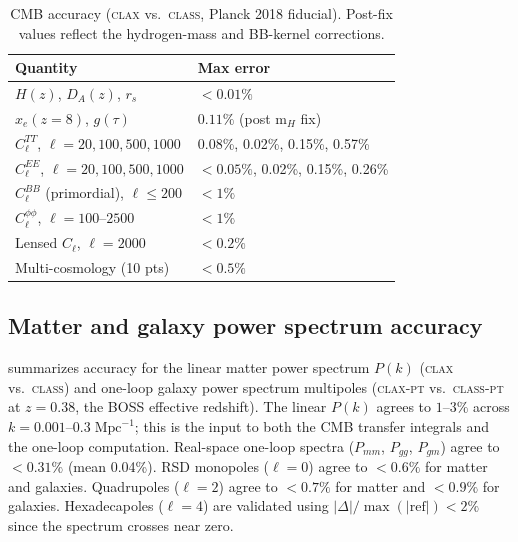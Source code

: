 \documentclass{article}
\newcommand{\clax}{\textsc{clax}\xspace}
\newcommand{\claxpt}{\textsc{clax-pt}\xspace}
\newcommand{\class}{\textsc{class}\xspace}
\newcommand{\classpt}{\textsc{class-pt}\xspace}
\newcommand{\Cl}{C_\ell}
\newcommand{\Pk}{P(k)}
\begin{document}
\begin{table}[t]
\caption{CMB accuracy (\clax vs.\ \class, Planck 2018 fiducial). Post-fix values reflect the hydrogen-mass and BB-kernel corrections.}
\label{tab:cmb_accuracy}
\centering
\footnotesize
\setlength{\tabcolsep}{3pt}
\begin{tabular}{@{}ll@{}}
\toprule
Quantity & Max error \\
\midrule
$H(z)$, $D_A(z)$, $r_s$ & $< 0.01\%$ \\
$x_e(z\!=\!8)$, $g(\tau)$ & $0.11\%$ (post m$_H$ fix) \\
$\Cl^{TT}$, $\ell = 20, 100, 500, 1000$ & 0.08\%, 0.02\%, 0.15\%, 0.57\% \\
$\Cl^{EE}$, $\ell = 20, 100, 500, 1000$ & $< 0.05\%$, 0.02\%, 0.15\%, 0.26\% \\
$\Cl^{BB}$ (primordial), $\ell \leq 200$ & $< 1\%$ \\
$\Cl^{\phi\phi}$, $\ell = 100$--$2500$ & $< 1\%$ \\
Lensed $\Cl$, $\ell = 2000$ & $< 0.2\%$ \\
Multi-cosmology (10 pts) & $< 0.5\%$ \\
\bottomrule
\end{tabular}
\end{table}

\subsection{Matter and galaxy power spectrum accuracy}

 summarizes accuracy for the linear matter power spectrum $\Pk$ (\clax vs.\ \class) and one-loop galaxy power spectrum multipoles (\claxpt vs.\ \classpt at $z = 0.38$, the BOSS effective redshift).
The linear $\Pk$ agrees to $1$--$3\%$ across $k = 0.001$--$0.3\;\mathrm{Mpc}^{-1}$; this is the input to both the CMB transfer integrals and the one-loop computation.
Real-space one-loop spectra ($P_{mm}$, $P_{gg}$, $P_{gm}$) agree to $< 0.31\%$ (mean 0.04\%).
RSD monopoles ($\ell = 0$) agree to $< 0.6\%$ for matter and galaxies.
Quadrupoles ($\ell = 2$) agree to $< 0.7\%$ for matter and $< 0.9\%$ for galaxies.
Hexadecapoles ($\ell = 4$) are validated using $|\Delta|/\max(|\mathrm{ref}|) < 2\%$ since the spectrum crosses near zero.
\end{document}
